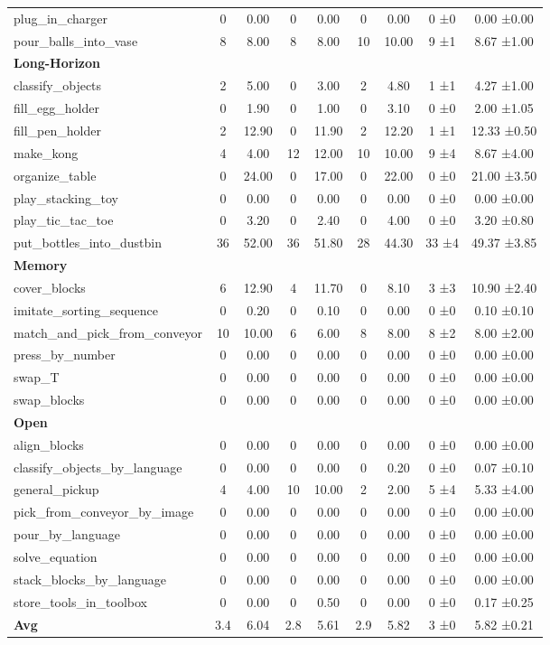 \begin{table}[H]
{\begin{tabular}{l|c|c|c|c|c|c|c|c}
plug\_in\_charger & 0 & 0.00 & 0 & 0.00 & 0 & 0.00 & 0 ±0 & 0.00 ±0.00 \\
pour\_balls\_into\_vase & 8 & 8.00 & 8 & 8.00 & 10 & 10.00 & 9 ±1 & 8.67 ±1.00 \\
\hline
\multicolumn{9}{l}{\textbf{Long-Horizon}} \\
classify\_objects & 2 & 5.00 & 0 & 3.00 & 2 & 4.80 & 1 ±1 & 4.27 ±1.00 \\
fill\_egg\_holder & 0 & 1.90 & 0 & 1.00 & 0 & 3.10 & 0 ±0 & 2.00 ±1.05 \\
fill\_pen\_holder & 2 & 12.90 & 0 & 11.90 & 2 & 12.20 & 1 ±1 & 12.33 ±0.50 \\
make\_kong & 4 & 4.00 & 12 & 12.00 & 10 & 10.00 & 9 ±4 & 8.67 ±4.00 \\
organize\_table & 0 & 24.00 & 0 & 17.00 & 0 & 22.00 & 0 ±0 & 21.00 ±3.50 \\
play\_stacking\_toy & 0 & 0.00 & 0 & 0.00 & 0 & 0.00 & 0 ±0 & 0.00 ±0.00 \\
play\_tic\_tac\_toe & 0 & 3.20 & 0 & 2.40 & 0 & 4.00 & 0 ±0 & 3.20 ±0.80 \\
put\_bottles\_into\_dustbin & 36 & 52.00 & 36 & 51.80 & 28 & 44.30 & 33 ±4 & 49.37 ±3.85 \\
\hline
\multicolumn{9}{l}{\textbf{Memory}} \\
cover\_blocks & 6 & 12.90 & 4 & 11.70 & 0 & 8.10 & 3 ±3 & 10.90 ±2.40 \\
imitate\_sorting\_sequence & 0 & 0.20 & 0 & 0.10 & 0 & 0.00 & 0 ±0 & 0.10 ±0.10 \\
match\_and\_pick\_from\_conveyor & 10 & 10.00 & 6 & 6.00 & 8 & 8.00 & 8 ±2 & 8.00 ±2.00 \\
press\_by\_number & 0 & 0.00 & 0 & 0.00 & 0 & 0.00 & 0 ±0 & 0.00 ±0.00 \\
swap\_T & 0 & 0.00 & 0 & 0.00 & 0 & 0.00 & 0 ±0 & 0.00 ±0.00 \\
swap\_blocks & 0 & 0.00 & 0 & 0.00 & 0 & 0.00 & 0 ±0 & 0.00 ±0.00 \\
\hline
\multicolumn{9}{l}{\textbf{Open}} \\
align\_blocks & 0 & 0.00 & 0 & 0.00 & 0 & 0.00 & 0 ±0 & 0.00 ±0.00 \\
classify\_objects\_by\_language & 0 & 0.00 & 0 & 0.00 & 0 & 0.20 & 0 ±0 & 0.07 ±0.10 \\
general\_pickup & 4 & 4.00 & 10 & 10.00 & 2 & 2.00 & 5 ±4 & 5.33 ±4.00 \\
pick\_from\_conveyor\_by\_image & 0 & 0.00 & 0 & 0.00 & 0 & 0.00 & 0 ±0 & 0.00 ±0.00 \\
pour\_by\_language & 0 & 0.00 & 0 & 0.00 & 0 & 0.00 & 0 ±0 & 0.00 ±0.00 \\
solve\_equation & 0 & 0.00 & 0 & 0.00 & 0 & 0.00 & 0 ±0 & 0.00 ±0.00 \\
stack\_blocks\_by\_language & 0 & 0.00 & 0 & 0.00 & 0 & 0.00 & 0 ±0 & 0.00 ±0.00 \\
store\_tools\_in\_toolbox & 0 & 0.00 & 0 & 0.50 & 0 & 0.00 & 0 ±0 & 0.17 ±0.25 \\
\hline
\textbf{Avg} & 3.4 & 6.04 & 2.8 & 5.61 & 2.9 & 5.82 & 3 ±0 & 5.82 ±0.21 \\
\hline
\end{tabular}
}
\end{table}
